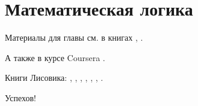 \chapter{Математическая логика}

Материалы для главы см. в книгах \cite{galiev2002}, \cite{kolmogorov2006}.

А также в курсе Coursera \cite{coursera:logic-introduction}.

Книги Лисовика:
\cite{lisovik2005b1},
\cite{lisovik2005b2},
\cite{lisovik2005b3},
\cite{lisovik2006b4},
\cite{lisovik2006b5},
\cite{lisovik2007b6},
\cite{lisovik2007}.

Успехов!
